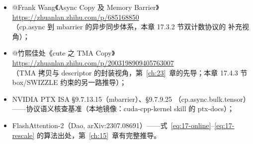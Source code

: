 \begin{itemize}
  \item @Frank Wang《Async Copy 及 Memory Barrier》\\
        \url{https://zhuanlan.zhihu.com/p/685168850}\\
        （cp.async 到 mbarrier 的异步同步体系，本章 17.3.2 节双计数协议的
        补充视角）；
  \item @竹熙佳处《cute 之 TMA Copy》\\
        \url{https://zhuanlan.zhihu.com/p/2003198909405763007}\\
        （TMA 拷贝与 descriptor 的封装视角，第~\ref{ch:23}~章的先导；本章
        17.4.3 节 box/SWIZZLE 约束的另一路推导）；
  \item NVIDIA PTX ISA §9.7.13.15（mbarrier）、§9.7.9.25
        （cp.async.bulk.tensor）——协议语义核查基准（本地镜像：cuda-cpp-kernel
        skill 的 ptx-docs）；
  \item FlashAttention-2（Dao, arXiv:2307.08691）——式~\ref{eq:17-online}--\ref{eq:17-rescale}
        的算法出处，第~\ref{ch:15}~章有完整推导。
\end{itemize}
